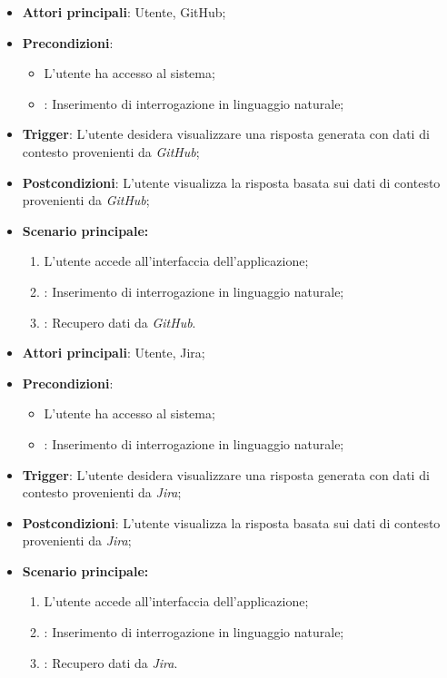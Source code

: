 \hypertarget{UC8.1}{}
\begin{itemize}
    \item \textbf{Attori principali}: Utente, GitHub;
    \item \textbf{Precondizioni}: 
    \begin{itemize}
        \item L'utente ha accesso al sistema;
        \item {}: Inserimento di interrogazione in linguaggio naturale;
    \end{itemize}
    \item \textbf{Trigger}: L'utente desidera visualizzare una risposta generata con dati di contesto provenienti da \emph{GitHub};
    \item \textbf{Postcondizioni}: L'utente visualizza la risposta basata sui dati di contesto provenienti da \emph{GitHub};
    \item \textbf{Scenario principale:}
    \begin{enumerate}
        \item L'utente accede all'interfaccia dell'applicazione;
        \item {}: Inserimento di interrogazione in linguaggio naturale;
        \item {}: Recupero dati da \emph{GitHub}.
    \end{enumerate}
\end{itemize}

\hypertarget{UC8.2}{}
\begin{itemize}
    \item \textbf{Attori principali}: Utente, Jira;
    \item \textbf{Precondizioni}: 
    \begin{itemize}
        \item L'utente ha accesso al sistema;
        \item {}: Inserimento di interrogazione in linguaggio naturale;
    \end{itemize}
    \item \textbf{Trigger}: L'utente desidera visualizzare una risposta generata con dati di contesto provenienti da \emph{Jira};
    \item \textbf{Postcondizioni}: L'utente visualizza la risposta basata sui dati di contesto provenienti da \emph{Jira};
    \item \textbf{Scenario principale:}
    \begin{enumerate}
        \item L'utente accede all'interfaccia dell'applicazione;
        \item {}: Inserimento di interrogazione in linguaggio naturale;
        \item {}: Recupero dati da \emph{Jira}.
    \end{enumerate}
\end{itemize}

